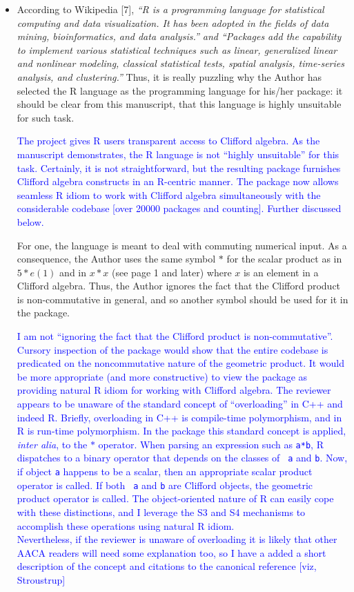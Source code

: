 \documentclass{article}
\begin{document}
\begin{itemize}
\item According to Wikipedia [7], {\em “R is a programming language for statistical computing and
data visualization. It has been adopted in the fields of data mining, bioinformatics, and data
analysis.” and “Packages add the capability to implement various statistical techniques such
as linear, generalized linear and nonlinear modeling, classical statistical tests, spatial analysis,
time-series analysis, and clustering.”}
Thus, it is really puzzling why the Author has selected the R language as the programming
language for his/her package: it should be clear from this manuscript, that this language is
highly unsuitable for such task.

\textcolor{blue}{The project gives R users transparent access to
  Clifford algebra.  As the manuscript demonstrates, the R language is
  not ``highly unsuitable'' for this task.  Certainly, it is not
  straightforward, but the resulting package furnishes Clifford
  algebra constructs in an R-centric manner.  The package now allows
  seamless R idiom to work with Clifford algebra simultaneously with
  the considerable codebase [over 20000 packages and counting].
  Further discussed below.}

For one, the language is meant to deal with commuting numerical
input. As a consequence, the Author uses the same symbol $*$ for the
scalar product as in $5* e(1)$ and in $x * x$ (see page 1 and later)
where $x$ is an element in a Clifford algebra.  Thus, the Author
ignores the fact that the Clifford product is non-commutative in
general, and so another symbol should be used for it in the package.

\textcolor{blue}{I am not ``ignoring the fact that the Clifford
  product is non-commutative''.  Cursory inspection of the package
  would show that the entire codebase is predicated on the
  noncommutative nature of the geometric product.  It would be more
  appropriate (and more constructive) to view the package as providing
  natural R idiom for working with Clifford algebra.  The reviewer
  appears to be unaware of the standard concept of ``overloading'' in
  C++ and indeed R.  Briefly, overloading in C++ is compile-time
  polymorphism, and in R is run-time polymorphism.  In the package
  this standard concept is applied, {\em inter alia}, to the $*$
  operator.  When parsing an expression such as {\tt a*b}, R
  dispatches to a binary operator that depends on the classes of {\tt
    a} and {\tt b}.  Now, if object {\tt a} happens to be a scalar,
  then an appropriate scalar product operator is called.  If both {\tt
    a} and {\tt b} are Clifford objects, the geometric product
  operator is called.  The object-oriented nature of R can easily cope
  with these distinctions, and I leverage the S3 and S4 mechanisms to
  accomplish these operations using natural R idiom.\\[20pt]
  Nevertheless, if the reviewer is unaware of overloading it is likely
  that other AACA readers will need some explanation too, so I have a
  added a short description of the concept and citations to the
  canonical reference [viz, Stroustrup]
}


\end{itemize}
\end{document}
